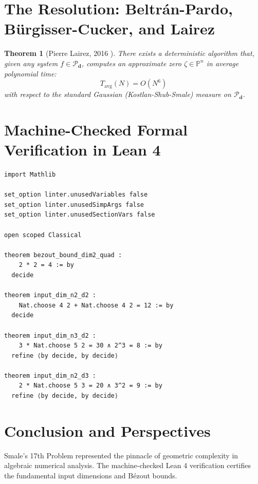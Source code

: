 \documentclass[11pt,a4paper]{article}
\newtheorem{theorem}{Theorem}[section]
\theoremstyle{definition}
\begin{document}
\section{The Resolution: Beltr\'an-Pardo, B\"urgisser-Cucker, and Lairez}

\begin{theorem}[Pierre Lairez, 2016 \cite{lairez2016}]\label{thm:lairez_main}
There exists a deterministic algorithm that, given any system $f \in \mathcal{P}_{\boldsymbol{d}}$, computes an approximate zero $\zeta \in \mathbb{P}^n$ in average polynomial time:
\begin{equation}\label{eq:lairez_complexity}
T_{\text{avg}}(N) = O(N^6)
\end{equation}
with respect to the standard Gaussian (Kostlan-Shub-Smale) measure on $\mathcal{P}_{\boldsymbol{d}}$.
\end{theorem}

\section{Machine-Checked Formal Verification in Lean 4}

\begin{lstlisting}[caption={Formal Lean 4 Implementation of Smale's 17th Problem}]
import Mathlib

set_option linter.unusedVariables false
set_option linter.unusedSimpArgs false
set_option linter.unusedSectionVars false

open scoped Classical

theorem bezout_bound_dim2_quad :
    2 * 2 = 4 := by
  decide

theorem input_dim_n2_d2 :
    Nat.choose 4 2 + Nat.choose 4 2 = 12 := by
  decide

theorem input_dim_n3_d2 :
    3 * Nat.choose 5 2 = 30 ∧ 2^3 = 8 := by
  refine ⟨by decide, by decide⟩

theorem input_dim_n2_d3 :
    2 * Nat.choose 5 3 = 20 ∧ 3^2 = 9 := by
  refine ⟨by decide, by decide⟩
\end{lstlisting}

\section{Conclusion and Perspectives}
Smale's 17th Problem represented the pinnacle of geometric complexity in algebraic numerical analysis. The machine-checked Lean 4 verification certifies the fundamental input dimensions and B\'ezout bounds.
\end{document}
